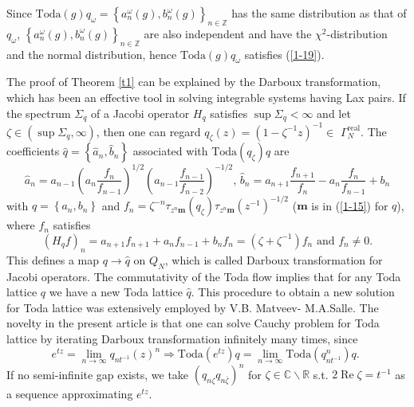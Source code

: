\documentclass[a4paper]{article}%
\begin{document}
Since $\mathrm{Toda}\left(  g\right)  q_{\omega}=\left\{  a_{n}^{\omega
}\left(  g\right)  ,b_{n}^{\omega}\left(  g\right)  \right\}  _{n\in
\mathbb{Z}}$ has the same distribution as that of $q_{\omega}$, $\left\{
a_{n}^{\omega}\left(  g\right)  ,b_{n}^{\omega}\left(  g\right)  \right\}
_{n\in\mathbb{Z}}$ are also independent and have the $\chi^{2}$-distribution
and the normal distribution, hence $\mathrm{Toda}\left(  g\right)  q_{\omega}$
satisfies (\ref{1-19}).

The proof of Theorem \ref{t1} can be explained by the Darboux transformation,
which has been an effective tool in solving integrable systems having Lax
pairs. If the spectrum $\Sigma_{q}$ of a Jacobi operator $H_{q}$ satisfies
$\sup\Sigma_{q}<\infty$ and let $\zeta\in\left(  \sup\Sigma_{q},\infty\right)
$, then one can regard $q_{\zeta}\left(  z\right)  =\left(  1-\zeta
^{-1}z\right)  ^{-1}\in$ $\Gamma_{N}^{\operatorname{real}}$. The coefficients
$\widehat{q}=\left\{  \widehat{a}_{n},\widehat{b}_{n}\right\}  $ associated
with $\mathrm{Toda}\left(  q_{\zeta}\right)  q$ are%
\[
\widehat{a}_{n}=a_{n-1}\left(  a_{n}\dfrac{f_{n}}{f_{n-1}}\right)
^{1/2}\left(  a_{n-1}\dfrac{f_{n-1}}{f_{n-2}}\right)  ^{-1/2}\text{,
\ }\widehat{b}_{n}=a_{n+1}\dfrac{f_{n+1}}{f_{n}}-a_{n}\dfrac{f_{n}}{f_{n-1}%
}+b_{n}%
\]
with $q=\left\{  a_{n},b_{n}\right\}  $ and $f_{n}=\zeta^{-n}\tau
_{z^{n}\boldsymbol{m}}\left(  q_{\zeta}\right)  \tau_{z^{n}\boldsymbol{m}%
}\left(  z^{-1}\right)  ^{-1/2}$ ($\boldsymbol{m}$ is in (\ref{1-15}) for
$q$), where $f_{n}$ satisfies%
\[
\left(  H_{q}f\right)  _{n}=a_{n+1}f_{n+1}+a_{n}f_{n-1}+b_{n}f_{n}=\left(
\zeta+\zeta^{-1}\right)  f_{n}\text{ and }f_{n}\neq0\text{.}%
\]
This defines a map $q\rightarrow\widehat{q}$ on $Q_{N}$, which is called
Darboux transformation for Jacobi operators. The commutativity of the Toda
flow implies that for any Toda lattice $q$ we have a new Toda lattice
$\widehat{q}$. This procedure to obtain a new solution for Toda lattice was
extensively employed by V.B. Matveev- M.A.Salle\cite{m1}. The novelty in the
present article is that one can solve Cauchy problem for Toda lattice by
iterating Darboux transformation infinitely many times, since%
\[
e^{tz}=\lim_{n\rightarrow\infty}q_{nt^{-1}}\left(  z\right)  ^{n}%
\Longrightarrow\mathrm{Toda}\left(  e^{tz}\right)  q=\lim_{n\rightarrow\infty
}\mathrm{Toda}\left(  q_{nt^{-1}}^{n}\right)  q\text{. }%
\]
If no semi-infinite gap exists, we take $\left(  q_{n\zeta}q_{n\overline
{\zeta}}\right)  ^{n}$ for $\zeta\in\mathbb{C}\backslash\mathbb{R}$ s.t.
$2\operatorname{Re}\zeta=t^{-1}$ as a sequence approximating $e^{tz}$.
\end{document}
